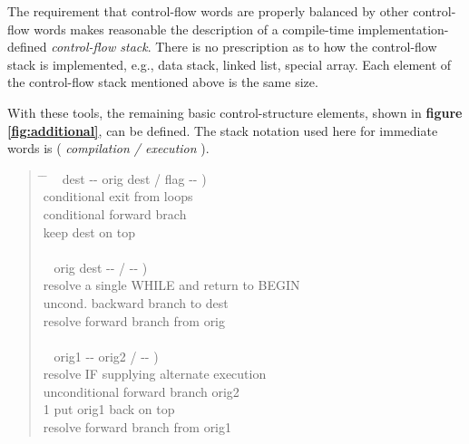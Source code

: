 The requirement that control-flow words are properly balanced by other
control-flow words makes reasonable the description of a compile-time
implementation-defined \emph{control-flow stack}. There is no
prescription as to how the control-flow stack is implemented, e.g.,
data stack, linked list, special array. Each element of the
control-flow stack mentioned above is the same size.

With these tools, the remaining basic control-structure elements,
shown in \textbf{figure \ref{fig:additional}}, can be defined. The
stack notation used here for immediate words is ( \emph{compilation
/ execution} ).

\begin{quote}\ttfamily
  \begin{tabbing}
	\tab \= \hspace{10em} \= \kill
	\+ \word{:} ~  dest -{}- orig dest / flag -{}- ) \\
		 conditional exit from loops \\
		 		\>  conditional forward brach \\
	 			\>  keep dest on top \\
	\word{;}  \\[2\parskip]

	\+	\word{:} ~  orig dest -{}- / -{}- ) \\
		 resolve a single WHILE and return to BEGIN \\
		 	\>  uncond. backward branch to dest \\
	\-	 		\>  resolve forward branch from orig \\
	\word{;}  \\[2\parskip]

	\+ \word{:} ~  orig1 -{}- orig2 / -{}- ) \\
		 resolve IF supplying alternate execution \\
		 	\>  unconditional forward branch orig2 \\
		1 				\>  put orig1 back on top \\
	\-	 			\>  resolve forward branch from orig1 \\
	\word{;} 
  \end{tabbing}
\end{quote}

